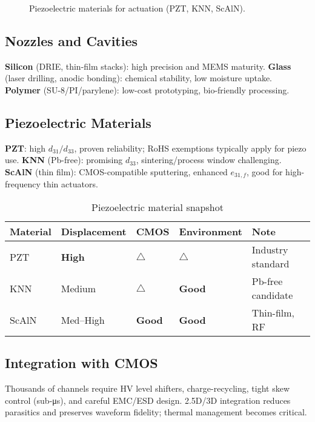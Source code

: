 \documentclass[conference]{IEEEtran}
\begin{document}
\begin{figure}[!t]
  \centering
  
  \caption{Piezoelectric materials for actuation (PZT, KNN, ScAlN).}
  \label{fig:piezo_materials}
\end{figure}

\subsection{Nozzles and Cavities}
\textbf{Silicon} (DRIE, thin-film stacks): high precision and MEMS maturity. 
\textbf{Glass} (laser drilling, anodic bonding): chemical stability, low moisture uptake. 
\textbf{Polymer} (SU-8/PI/parylene): low-cost prototyping, bio-friendly processing.

\subsection{Piezoelectric Materials}
\textbf{PZT}: high $d_{31}/d_{33}$, proven reliability; RoHS exemptions typically apply for piezo use. 
\textbf{KNN} (Pb-free): promising $d_{33}$, sintering/process window challenging. 
\textbf{ScAlN} (thin film): CMOS-compatible sputtering, enhanced $e_{31,f}$, good for high-frequency thin actuators.

\begin{table}[!t]
\caption{Piezoelectric material snapshot}
\label{tab:piezo}
\centering\footnotesize
\begin{tabular*}{\columnwidth}{@{\extracolsep{\fill}}lllll@{}}
\toprule
Material & Displacement & CMOS & Environment & Note \\
\midrule
PZT   & \textbf{High}   & $\triangle$ & $\triangle$ & Industry standard \\
KNN   & Medium          & $\triangle$ & \textbf{Good} & Pb-free candidate \\
ScAlN & Med--High       & \textbf{Good} & \textbf{Good} & Thin-film, RF \\
\bottomrule
\end{tabular*}
\end{table}

\subsection{Integration with CMOS}
Thousands of channels require HV level shifters, charge-recycling, tight skew control (sub-\si{\micro\second}), and careful EMC/ESD design. 2.5D/3D integration reduces parasitics and preserves waveform fidelity; thermal management becomes critical.
\end{document}
